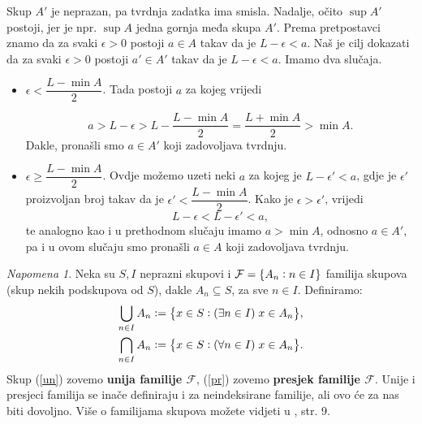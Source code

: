 \documentclass{book}
\let\originalleft\left
\let\originalright\right
\renewcommand{\left}{\mathopen{}\mathclose\bgroup\originalleft}
\renewcommand{\right}{\aftergroup\egroup\originalright}
\renewenvironment{proof}{%
    \vspace{-\parskip}\begin{oldproof}%
    }{%
    \end{oldproof}%
}
\theoremstyle{definition}
\theoremstyle{definition}
\theoremstyle{remark}
\newtheorem{remark}{Napomena}
\begin{document}
\begin{proof}[Rješenje]
Skup $A'$ je neprazan, pa tvrdnja zadatka ima smisla. Nadalje, očito $\sup{A'}$ postoji, jer je npr. $\sup{A}$ jedna gornja međa skupa $A'$. Prema pretpostavci znamo da za svaki $\epsilon>0$ postoji $a\in A$ takav da je $L-\epsilon<a$. Naš je cilj dokazati da za svaki $\epsilon>0$ postoji $a'\in A'$ takav da je $L-\epsilon<a$. Imamo dva slučaja.
\begin{itemize}
\item $\epsilon<\dfrac{L-\min{A}}{2}$. Tada postoji $a$ za kojeg vrijedi

$$a>L-\epsilon>L-\dfrac{L-\min{A}}{2}=\dfrac{L+\min{A}}{2}>\min{A}.$$
Dakle, pronašli smo $a\in A'$ koji zadovoljava tvrdnju.
\item $\epsilon\geq \dfrac{L-\min{A}}{2}$. Ovdje možemo uzeti neki $a$ za kojeg je $L-\epsilon'<a$, gdje je $\epsilon'$ proizvoljan broj takav da je $\epsilon'<\dfrac{L-\min{A}}{2}$. Kako je $\epsilon>\epsilon'$, vrijedi
$$L-\epsilon<L-\epsilon'<a,$$
te analogno kao i u prethodnom slučaju imamo $a>\min{A}$, odnosno $a\in A'$, pa i u ovom slučaju smo pronašli $a\in A$ koji zadovoljava tvrdnju. \qedhere
\end{itemize}
\end{proof}
\begin{remark}
\label{unprfam}
Neka su $S,I$ neprazni skupovi i $\mathcal{F}=\left\{A_n : n\in I\right\}$ familija skupova (skup nekih podskupova od $S$), dakle $A_n\subseteq S$, za sve $n\in I$. Definiramo:
\begin{gather}
\label{un}
\bigcup_{n\in I}{A_n}:=\left\{x\in S : (\exists n\in I)\; x\in A_n\right\},\\
\label{pr}
\bigcap_{n\in I}{A_n}:=\left\{x\in S : (\forall n\in I)\; x\in A_n\right\}.
\end{gather}
Skup (\ref{un}) zovemo \textbf{unija familije $\mathcal{F}$}, (\ref{pr}) zovemo \textbf{presjek familije $\mathcal{F}$}. Unije i presjeci familija se inače definiraju i za neindeksirane familije, ali ovo će za nas biti dovoljno. Više o familijama skupova možete vidjeti u \cite{9}, str. 9.
\end{remark}
\end{document}

